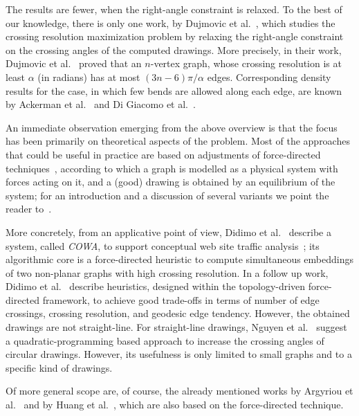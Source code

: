 \documentclass{comjnl}
\begin{document}
The results are fewer, when the right-angle constraint is relaxed. To the best of our knowledge, there is only one work, by Dujmovic et al.~\cite{DBLP:journals/cjtcs/DujmovicGMW11}, which studies the crossing resolution maximization problem by relaxing the right-angle constraint on the crossing angles of the computed drawings. More precisely, in their work, Dujmovic et al.~\cite{DBLP:journals/cjtcs/DujmovicGMW11} proved that an $n$-vertex graph, whose crossing resolution is at least $\alpha$ (in radians) has at most $(3n-6)\pi/\alpha$ edges. Corresponding density results for the case, in which few bends are allowed along each edge, are known by Ackerman et al.~\cite{DBLP:journals/siamdm/AckermanFT12} and Di Giacomo et al.~\cite{DBLP:journals/mst/GiacomoDLM11}.

An immediate observation emerging from the above overview is that the focus has been primarily on theoretical aspects of the problem. Most of the approaches that could be useful in practice are based on adjustments of force-directed techniques~\cite{DBLP:journals/congnum/Eades84}, according to which a graph is modelled as a physical system with forces acting on it, and a (good) drawing is obtained by an equilibrium of the system; for an introduction and a discussion of several variants we point the reader to~\cite{DBLP:books/ph/BattistaETT99}. 

More concretely, from an applicative point of view, Didimo et al.~\cite{DBLP:conf/apvis/DidimoLR10} describe a system, called \emph{COWA},  to support conceptual web site traffic analysis~\cite{DBLP:conf/apvis/DidimoLR10}; its algorithmic core is a force-directed heuristic to compute simultaneous embeddings of two non-planar graphs with high crossing resolution.
%
In a follow up work, Didimo et al.~\cite{DBLP:conf/gd/DidimoLR10} describe heuristics, designed within the topology-driven force-directed framework, to achieve good trade-offs in terms of number of edge crossings, crossing resolution, and geodesic edge tendency.
%
However, the obtained drawings are not straight-line. For straight-line drawings, Nguyen et al.~\cite{DBLP:conf/gd/NguyenEHH10} suggest a quadratic-programming based approach to increase the crossing angles of circular drawings. However, its usefulness is only limited to small graphs and to a specific kind of drawings.

Of more general scope are, of course, the already mentioned works by Argyriou et al.~\cite{DBLP:journals/cj/ArgyriouBS13} and by Huang et al.~\cite{DBLP:journals/vlc/HuangEHL13}, which are also based on the force-directed technique.
\end{document}
